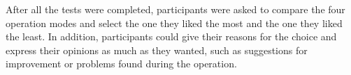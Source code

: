 After all the tests were completed, participants were asked to compare the four operation modes and select the one they liked the most and the one they liked the least. In addition, participants could give their reasons for the choice and express their opinions as much as they wanted, such as suggestions for improvement or problems found during the operation.

